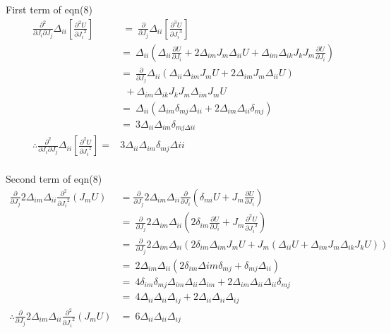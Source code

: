 \documentclass[12pt, letterpaper]{article}
\newcommand*{\1}{\hspace{1pt}}
\begin{document}
    First term of eqn(8)
    \begin{align*}
        \frac{\partial ^2}{\partial J_{i} \partial J_{j}} \Delta _{ii} [\frac{\partial ^2 U}{{\partial J_{i}}^2}]  & \ = \ \frac{\partial }{\partial J_{j}} \Delta _{ii} [\frac{\partial^3 U}{{\partial J_{i}}^3}] \\
         &  =  \ \Delta_{ii} (\Delta_{ii} \frac{\partial U}{\partial J_{i}} + 2\Delta_{im}J_{m}\Delta_{ii}U + \Delta_{im}\Delta_{ik}J_{k}J_{m}\frac{\partial U}{\partial J_{i}}) \\
         & =  \ \frac{\partial}{\partial J_{j}}\Delta_{ii} (\Delta_{ii}\Delta_{im}J_{m}U + 2\Delta_{im}J_{m}\Delta_{ii}U) \\
          & \ \ +  \Delta_{im}\Delta_{ik}J_{k}J_{m}\Delta_{im}J_{m}U \\
         & =  \ \Delta_{ii}(\Delta_{im}\delta_{mj}\Delta_{ii} + 2\Delta_{im}\Delta_{ii}\delta_{mj})  \tag*{[putting J=0]} \\
         & =  \ 3\Delta_{ii}\Delta_{im}\delta_{mj\Delta{ii}} \\
        \therefore \frac{\partial ^2}{\partial J_{i} \partial J_{j}} \Delta _{ii} [\frac{\partial ^2 U}{{\partial J_{i}}^2}] = & 3\Delta_{ii}\Delta_{im}\delta_{mj}\Delta{ii} \\
    \end{align*}

    Second term of eqn(8)
    \begin{align*}
        \frac{\partial}{\partial J_{j}} 2\Delta_{im}\Delta_{ii}\frac{\partial ^2}{{\partial J_{i}}^2}(J_{m}U) & = \frac{\partial}{\partial J_{j}} 2\Delta_{im}\Delta_{ii} \frac{\partial}{\partial J_{i}}(\delta_{mi} U + J_{m}\frac{\partial U}{\partial J_{i}}) \\
         & = \ \frac{\partial}{\partial J_{j}}2\Delta_{im}\Delta_{ii}(2\delta_{im}\frac{\partial U}{\partial J_{i}} + J_{m}\frac{\partial ^2 U}{{\partial J_{i}}^2}) \\
         & = \ \frac{\partial}{\partial J_{j}}2\Delta_{im}\Delta_{ii}(2\delta_{im}\Delta_{im}J_{m}U +J_{m} (\Delta_{ii}U + \Delta_{im}J_{m}\Delta_{ik}J_{k}U)) \\ 
         & = \ 2\Delta_{im}\Delta_{ii}(2\delta_{im}\Delta{im}\delta_{mj} + \delta_{mj}\Delta_{ii}) \tag*{[putting J=0]} \\ 
         & = \ 4\delta_{im}\delta_{mj}\Delta_{im}\Delta_{ii}\Delta_{im} + 2\Delta_{im}\Delta_{ii}\Delta_{ii}\delta_{mj} \\
         & = \ 4\Delta_{ii}\Delta_{ii}\Delta_{ij} + 2\Delta_{ii}\Delta_{ii}\Delta_{ij} \\
        \therefore \frac{\partial}{\partial J_{j}} 2\Delta_{im}\Delta_{ii}\frac{\partial ^2}{{\partial J_{i}}^2}(J_{m}U) & = \ 6\Delta_{ii}\Delta_{ii}\Delta_{ij} \\
    \end{align*}
\end{document}
